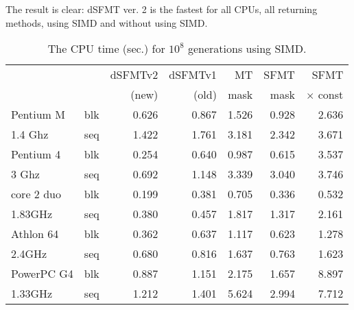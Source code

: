 \documentclass{svmult}
\begin{document}
The result is clear: dSFMT ver. 2 is the fastest for all CPUs, all
returning methods, using SIMD and without using SIMD.

\begin{table}
  \begin{center}
    \caption{The CPU time (sec.) for $10^8$ generations using SIMD.}
    \label{tab:speed-simd}
    \begin{tabular}{|ll|r|r|r|r|r|} \hline
      && dSFMTv2 & dSFMTv1 & MT & SFMT & SFMT \\
      && (new) & (old) & mask & mask & $\times$ const \\ \hline \hline
      Pentium M & blk & 0.626 & 0.867 & 1.526 & 0.928 & 2.636 \\
      1.4 Ghz & seq & 1.422 & 1.761 & 3.181 & 2.342 & 3.671 \\ \hline
      Pentium 4 & blk & 0.254 & 0.640 & 0.987 & 0.615 & 3.537 \\
      3 Ghz & seq & 0.692 & 1.148 & 3.339 & 3.040 & 3.746 \\ \hline
      core 2 duo & blk & 0.199 & 0.381 & 0.705 & 0.336 & 0.532 \\
      1.83GHz & seq & 0.380 & 0.457 & 1.817 & 1.317 & 2.161 \\\hline
      Athlon 64 & blk & 0.362 & 0.637 & 1.117 & 0.623 & 1.278 \\
      2.4GHz & seq & 0.680 & 0.816 & 1.637 & 0.763 & 1.623 \\ \hline
      PowerPC G4& blk & 0.887 & 1.151 & 2.175 & 1.657 & 8.897 \\
      1.33GHz & seq & 1.212 & 1.401 & 5.624 & 2.994 & 7.712 \\ \hline
    \end{tabular}
  \end{center}
\end{table}
\end{document}
